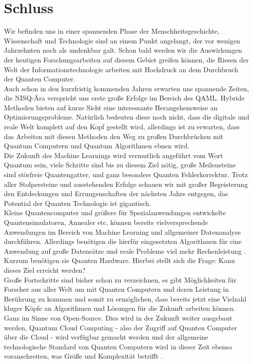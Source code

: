 \section{Schluss}
\label{sec:conclusion}
Wir befinden uns in einer spannenden Phase der Menschheitsgeschichte, Wissenschaft und Technologie sind an einem Punkt angelangt, der vor wenigen Jahrzehnten noch als undenkbar galt. Schon bald werden wir die Auswirkungen der heutigen Forschungsarbeiten auf diesem Gebiet greifen können, die Riesen der Welt der Informationstechnologie arbeiten mit Hochdruck an dem Durchbruch der Quanten Computer.\\

Auch schon in den kurzfristig kommenden Jahren erwarten uns spannende Zeiten, die NISQ-Ära verspricht uns erste große Erfolge im Bereich des QAML. Hybride Methoden bieten auf kurze Sicht eine interessante Herangehensweise an Optimierungsprobleme. Natürlich bedeuten diese noch nicht, dass die digitale und reale Welt komplett auf den Kopf gestellt wird, allerdings ist zu erwarten, dass das Arbeiten mit diesen Methoden den Weg zu großen Durchbrüchen mit Quantum Computern und Quantum Algorithmen ebnen wird.\\

Die Zukunft des Machine Learnings wird vermutlich angeführt vom Wort Quantum sein, viele Schritte sind bis zu diesem Ziel nötig, große Meilensteine sind störfreie Quantengatter, und ganz besonders Quanten Fehlerkorrektur. Trotz aller Stolpersteine und ausstehenden Erfolge schauen wir mit großer
Begeisterung den Entdeckungen und Errungenschaften der nächsten Jahre entgegen, das Potential der Quanten Technologie ist gigantisch.\\

Kleine Quantencomputer und größere für Spezialanwendungen entwickelte
Quantensimulatoren, Annealer etc. können bereits vielversprechende Anwendungen im Bereich von Machine Learning und allgemeiner Datenanalyse durchführen. Allerdings benötigen die hierfür eingesetzten Algorithmen für eine Anwendung auf große Datensätze und reale Probleme viel mehr Rechenleistung \cite{biamonte2017quantum}.\\
Kurzum benötigen sie Quanten Hardware. Hierbei stellt sich die Frage: Kann dieses Ziel erreicht werden? \\ 

Große Fortschritte sind bisher schon zu verzeichnen, es gibt Möglichkeiten für Forscher aus aller Welt um mit Quanten Computern und deren Leistung in Berührung zu kommen und somit zu ermöglichen, dass bereits jetzt eine Vielzahl kluger Köpfe an Algorithmen und Lösungen für die Zukunft arbeiten können. Ganz im Sinne von Open-Source. Dies wird in der Zukunft weiter ausgebaut werden, Quantum Cloud Computing - also der Zugriff auf Quanten Computer über die Cloud - wird verfügbar gemacht werden und der allgemeine technologische Standard von Quanten Computern wird in dieser Zeit ebenso voranschreiten, was Größe und Komplexität betrifft \cite{biamonte2017quantum}.\\

